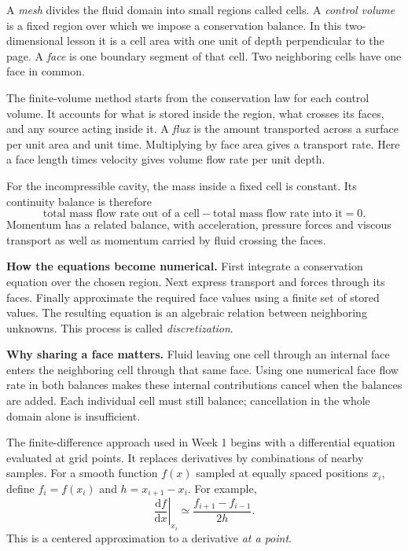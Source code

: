 A \emph{mesh} divides the fluid domain into small regions called cells.
A \emph{control volume} is a fixed region over which we impose a conservation
balance. In this two-dimensional lesson it is a cell area with one unit of
depth perpendicular to the page. A \emph{face} is one boundary segment of
that cell. Two neighboring cells have one face in common.

The finite-volume method starts from the conservation law for each control
volume. It accounts for what is stored inside the region, what crosses its
faces, and any source acting inside it. A \emph{flux} is the amount transported
across a surface per unit area and unit time. Multiplying by face area gives
a transport rate. Here a face length times velocity gives volume flow rate
per unit depth.

For the incompressible cavity, the mass inside a fixed cell is constant.
Its continuity balance is therefore
\[
\boxed{\text{total mass flow rate out of a cell}
       -\text{total mass flow rate into it}=0.}
\]
Momentum has a related balance, with acceleration, pressure forces and viscous
transport as well as momentum carried by fluid crossing the faces.

\textbf{How the equations become numerical.}
First integrate a conservation equation over the chosen region. Next express
transport and forces through its faces. Finally approximate the required
face values using a finite set of stored values. The resulting equation is
an algebraic relation between neighboring unknowns. This process is called
\emph{discretization}.

\textbf{Why sharing a face matters.} Fluid leaving one cell through an internal
face enters the neighboring cell through that same face. Using one numerical
face flow rate in both balances makes these internal contributions cancel
when the balances are added. Each individual cell must still balance;
cancellation in the whole domain alone is insufficient.

\newpage
{}
The finite-difference approach used in Week 1 begins with a differential
equation evaluated at grid points. It replaces derivatives by combinations
of nearby samples. For a smooth function $f(x)$ sampled at equally spaced
positions $x_i$, define $f_i=f(x_i)$ and $h=x_{i+1}-x_i$. For example,
\[
\left.\frac{\mathrm df}{\mathrm dx}\right|_{x_i}
\simeq\frac{f_{i+1}-f_{i-1}}{2h}.
\]
This is a centered approximation to a derivative \emph{at a point}.

